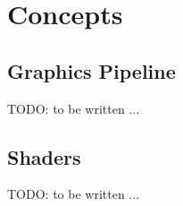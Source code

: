 \chapter{Concepts}

\section{Graphics Pipeline}
TODO: to be written ...

\section{Shaders}
TODO: to be written ...
